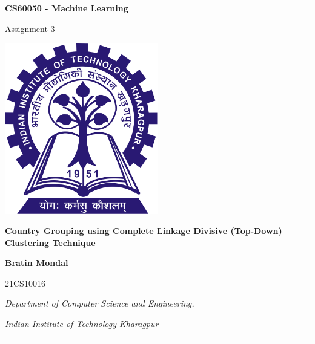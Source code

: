 \documentclass[12pt]{article}
\newcommand{\myName}{Bratin Mondal}
\newcommand{\myRollNumber}{21CS10016}
\newcommand{\myCourse}{CS60050 - Machine Learning}
\newcommand{\myAssignment}{3}
\newcommand{\myAssignmentTitle}{Country Grouping using Complete Linkage Divisive (Top-Down) Clustering Technique}
\newcommand{\myUniversity}{Indian Institute of Technology Kharagpur}
\begin{document}
	
	\begin{titlepage}
		\centering
		
		{\Huge{\textbf{\myCourse}}}
		\vspace{0.5cm}
		
		{\Huge{Assignment \myAssignment}}
		
		\vspace{2cm}
		
		\includegraphics[width=0.5\textwidth]{iit_kgp_logo.png}
		
		\vspace{2cm}
		
		{\Huge\textbf{\myAssignmentTitle}}
		
		\vspace{2cm}
		
		{\Large\textbf{\myName}} 
		\vspace{0.2cm}
		
		\large{\myRollNumber}    
		\vspace{2cm}
		
		{\large\textit{Department of Computer Science and Engineering,}}
		
		{\large\textit{\myUniversity}}
		\vspace{0.3cm}
		
		\hrule 
		\vspace{0.5cm}
		
		
	\end{titlepage}
	
\end{document}
